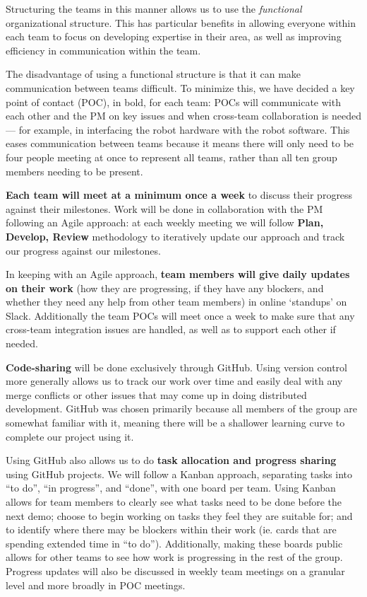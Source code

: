 \documentclass{article}
\begin{document}
Structuring the teams in this manner allows us to use the {\it functional} organizational structure. This has particular benefits in allowing everyone within each team to focus on developing expertise in their area, as well as improving efficiency in communication within the team.

The disadvantage of using a functional structure is that it can make communication between teams difficult. To minimize this, we have decided a key point of contact (POC), in bold, for each team: POCs will communicate with each other and the PM on key issues and when cross-team collaboration is needed --- for example, in interfacing the robot hardware with the robot software. This eases communication between teams because it means there will only need to be four people meeting at once to represent all teams, rather than all ten group members needing to be present.

{\bf Each team will meet at a minimum once a week} to discuss their progress against their milestones. Work will be done in collaboration with the PM following an Agile approach: at each weekly meeting we will follow {\bf Plan, Develop, Review} methodology to iteratively update our approach and track our progress against our milestones.

In keeping with an Agile approach, {\bf team members will give daily updates on their work} (how they are progressing, if they have any blockers, and whether they need any help from other team members) in online `standups' on Slack. Additionally the team POCs will meet once a week to make sure that any cross-team integration issues are handled, as well as to support each other if needed. 

{\bf Code-sharing} will be done exclusively through GitHub. Using version control more generally allows us to track our work over time and easily deal with any merge conflicts or other issues that may come up in doing distributed development. GitHub was chosen primarily because all members of the group are somewhat familiar with it, meaning there will be a shallower learning curve to complete our project using it. 

Using GitHub also allows us to do {\bf task allocation and progress sharing} using GitHub projects. We will follow a Kanban approach, separating tasks into ``to do'', ``in progress'', and ``done'', with one board per team. Using Kanban allows for team members to clearly see what tasks need to be done before the next demo; choose to begin working on tasks they feel they are suitable for; and to identify where there may be blockers within their work (ie. cards that are spending extended time in ``to do''). Additionally, making these boards public allows for other teams to see how work is progressing in the rest of the group. Progress updates will also be discussed in weekly team meetings on a granular level and more broadly in POC meetings.
\end{document}
